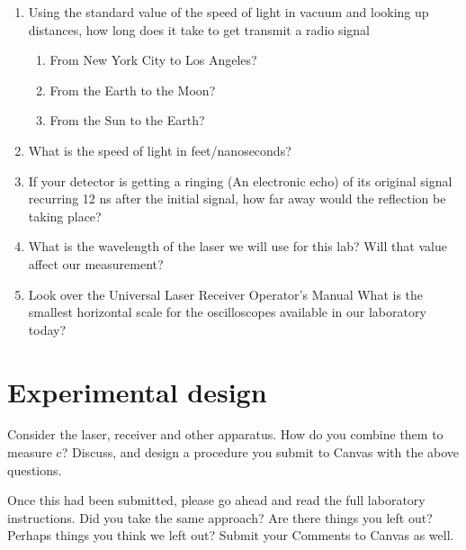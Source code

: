 \documentclass{tufte-handout}
\begin{document}
    \begin{enumerate}
        \item Using the standard value of the speed of light in vacuum and looking up distances, how long does it take to get transmit a radio signal
            \begin{enumerate}
                \item From New York City to Los Angeles?
                \item From the Earth to the Moon?
                \item From the Sun to the Earth?
            \end{enumerate}

        \item What is the speed of light in feet/nanoseconds?
        \item If your detector is getting a ringing (An electronic echo) of its original signal recurring 12 ns after the initial signal, how far away would the reflection be taking place?
        \item What is the wavelength of the laser we will use for this lab? Will that value affect our measurement?

        \item Look over the Universal Laser Receiver Operator’s Manual
            What is the smallest horizontal scale for the oscilloscopes available in our laboratory today?

    \end{enumerate}

\section{Experimental design}
Consider the laser, receiver and other apparatus. How do you combine them to measure c?
Discuss, and design a procedure you submit to Canvas with the above questions.

Once this had been submitted, please go ahead and read the full laboratory instructions. Did
you take the same approach? Are there things you left out? Perhaps things you think we left
out? Submit your Comments to Canvas as well.
\end{document}
